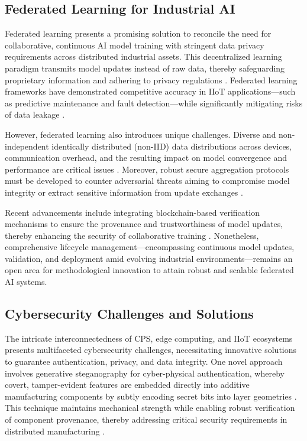 \documentclass[11pt]{article}
\begin{document}
\subsection{Federated Learning for Industrial AI}

Federated learning presents a promising solution to reconcile the need for collaborative, continuous AI model training with stringent data privacy requirements across distributed industrial assets. This decentralized learning paradigm transmits model updates instead of raw data, thereby safeguarding proprietary information and adhering to privacy regulations \cite{ref32}. Federated learning frameworks have demonstrated competitive accuracy in IIoT applications—such as predictive maintenance and fault detection—while significantly mitigating risks of data leakage \cite{ref34}.

However, federated learning also introduces unique challenges. Diverse and non-independent identically distributed (non-IID) data distributions across devices, communication overhead, and the resulting impact on model convergence and performance are critical issues \cite{ref36}. Moreover, robust secure aggregation protocols must be developed to counter adversarial threats aiming to compromise model integrity or extract sensitive information from update exchanges \cite{ref37}.

Recent advancements include integrating blockchain-based verification mechanisms to ensure the provenance and trustworthiness of model updates, thereby enhancing the security of collaborative training \cite{ref38}. Nonetheless, comprehensive lifecycle management—encompassing continuous model updates, validation, and deployment amid evolving industrial environments—remains an open area for methodological innovation to attain robust and scalable federated AI systems.

\subsection{Cybersecurity Challenges and Solutions}

The intricate interconnectedness of CPS, edge computing, and IIoT ecosystems presents multifaceted cybersecurity challenges, necessitating innovative solutions to guarantee authentication, privacy, and data integrity. One novel approach involves generative steganography for cyber-physical authentication, whereby covert, tamper-evident features are embedded directly into additive manufacturing components by subtly encoding secret bits into layer geometries \cite{ref9}. This technique maintains mechanical strength while enabling robust verification of component provenance, thereby addressing critical security requirements in distributed manufacturing \cite{ref13}.
\end{document}
